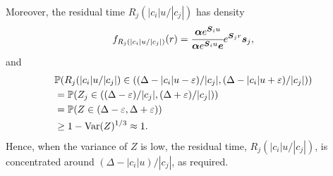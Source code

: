 
Moreover, the residual time \(R_j(|c_i|u/|c_j|)\) has density 
\[f_{R_j(|c_i|u/|c_j|)}(r) = \cfrac{\boldsymbol\alpha e^{\boldsymbol S_iu } }{\boldsymbol\alpha e^{\boldsymbol S_iu } \boldsymbol e}e^{\boldsymbol S_j r}\boldsymbol s_j,\]
and 
\begin{align}
	&\mathbb P(R_j(|c_i|u/|c_j|) \in ((\Delta-|c_i|u-\varepsilon)/|c_j|, (\Delta-|c_i|u + \varepsilon)/|c_j| )) \nonumber
	\\&=\mathbb P(Z_j\in ((\Delta-\varepsilon)/|c_j|, (\Delta + \varepsilon)/|c_j|)) 
	\\&=\mathbb P(Z\in (\Delta-\varepsilon ,  \Delta + \varepsilon )) 
	\\&\geq 1-\mathrm{Var}(Z)^{1/3} \approx 1.
\end{align}
Hence, when the variance of \(Z\) is low, the residual time, \(R_j(|c_i|u/|c_j|)\), is concentrated around \((\Delta - |c_i|u)/|c_j|\), as required. 


